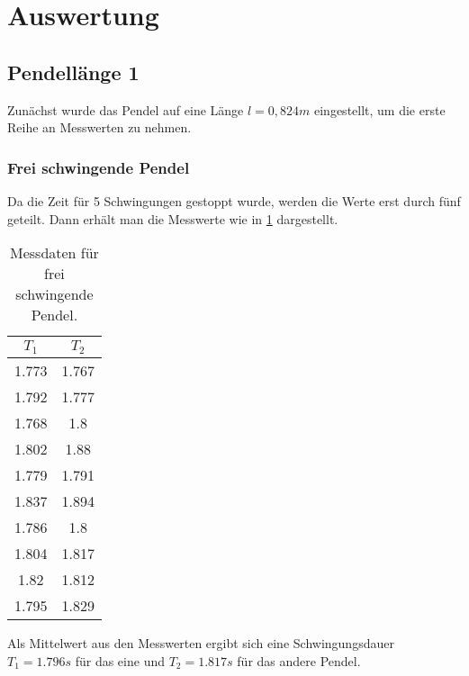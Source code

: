 \section{Auswertung}
\subsection{Pendellänge 1}
Zunächst wurde das Pendel auf eine Länge $l = 0,824 m$ eingestellt, um die erste Reihe an Messwerten zu nehmen.

\subsubsection{Frei schwingende Pendel}
Da die Zeit für 5 Schwingungen gestoppt wurde, werden die
Werte erst durch fünf geteilt. Dann erhält man die Messwerte
wie in \ref{tab:frei} dargestellt.
\begin{table}
    \centering
    \caption{Messdaten für frei schwingende Pendel.}
    \label{tab:frei}
    \begin{tabular}{c c}
     \toprule
     $T_1$ & $T_2$\\
     \midrule
     1.773 & 1.767 \\
     1.792 & 1.777 \\
     1.768 & 1.8 \\
     1.802 & 1.88\\
     1.779 & 1.791\\
     1.837 & 1.894\\
     1.786 & 1.8 \\
     1.804 & 1.817\\
     1.82 & 1.812 \\
     1.795 & 1.829 \\
     \bottomrule
    \end{tabular}
\end{table}
Als Mittelwert aus den Messwerten ergibt sich eine
Schwingungsdauer $T_1 = 1.796 s$ für das eine und 
$T_2 = 1.817 s$ für das andere Pendel.

